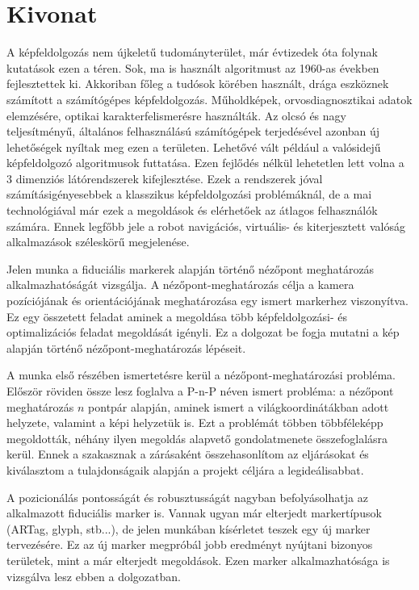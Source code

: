 \chapter*{Kivonat}
A képfeldolgozás nem újkeletű tudományterület, már évtizedek óta folynak kutatások ezen a téren.
Sok, ma is használt algoritmust az 1960-as években fejlesztettek ki.
Akkoriban főleg a tudósok körében használt, drága eszköznek számított a számítógépes képfeldolgozás.
Műholdképek, orvosdiagnosztikai adatok elemzésére, optikai karakterfelismerésre használták.
Az olcsó és nagy teljesítményű, általános felhasználású számítógépek terjedésével azonban új lehetőségek nyíltak meg ezen a területen.
Lehetővé vált például a valósidejű képfeldolgozó algoritmusok futtatása.
Ezen fejlődés nélkül lehetetlen lett volna a 3 dimenziós látórendszerek kifejlesztése.
Ezek a rendszerek jóval számításigényesebbek a klasszikus képfeldolgozási problémáknál, de a mai technológiával már ezek a megoldások és elérhetőek az átlagos felhasználók számára.
Ennek legfőbb jele a robot navigációs, virtuális- és kiterjesztett valóság alkalmazások széleskörű megjelenése.

Jelen munka a fiduciális markerek alapján történő nézőpont meghatározás alkalmazhatóságát vizsgálja.
A nézőpont-meghatározás célja a kamera pozíciójának és orientációjának meghatározása egy ismert markerhez viszonyítva.
Ez egy összetett feladat aminek a megoldása több képfeldolgozási- és optimalizációs feladat megoldását igényli.
Ez a dolgozat be fogja mutatni a kép alapján történő nézőpont-meghatározás lépéseit.

A munka első részében ismertetésre kerül a nézőpont-meghatározási probléma.
Először röviden össze lesz foglalva a P-n-P néven ismert probléma: a nézőpont meghatározás $n$ pontpár alapján, aminek ismert a világkoordinátákban adott helyzete, valamint a képi helyzetük is.
Ezt a problémát többen többféleképp megoldották, néhány ilyen megoldás alapvető gondolatmenete összefoglalásra kerül.
Ennek a szakasznak a zárásaként összehasonlítom az eljárásokat és kiválasztom a tulajdonságaik alapján a projekt céljára a legideálisabbat.

A pozicionálás pontosságát és robusztusságát nagyban befolyásolhatja az alkalmazott fiduciális marker is.
Vannak ugyan már elterjedt markertípusok (ARTag, glyph, stb...), de jelen munkában kísérletet teszek egy új marker tervezésére.
Ez az új marker megpróbál jobb eredményt nyújtani bizonyos területek, mint a már elterjedt megoldások.
Ezen marker alkalmazhatósága is vizsgálva lesz ebben a dolgozatban.

